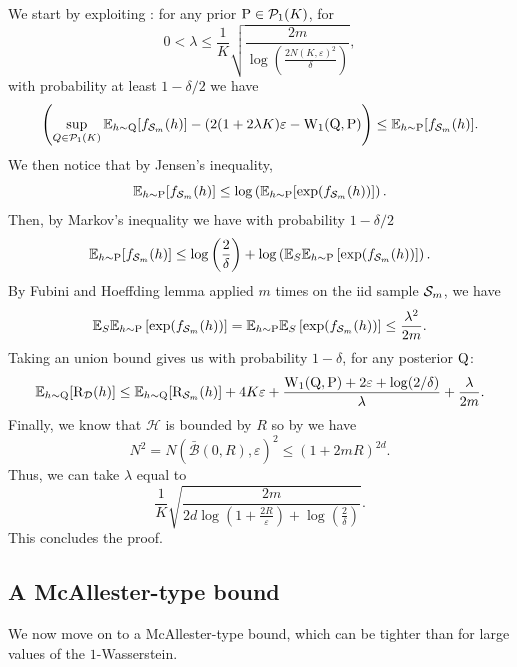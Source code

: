 We start by exploiting : for any prior $\P\in\mathcal{P}_1(K)$, for $$0<\lambda \leq  \frac{1}{K}\sqrt{\frac{2m}{\log\left(\frac{2N(K,\varepsilon)^2}{\delta}\right)}},$$
with probability at least $1-\delta/2$ we have
\[ \left(\sup_{Q\in \mathcal{P}_1(K)} \mathbb{E}_{h\sim \Q}[ f_{\Sm}(h)] - (2(1+2\lambda K)\varepsilon - \W_{1}(\Q,\P) \right) \leq \mathbb{E}_{h\sim \P}[ f_{\Sm}(h)]. \]
We then notice that by Jensen's inequality,  $$\mathbb{E}_{h\sim \P}[ f_{\Sm}(h)] \leq \log\left(\mathbb{E}_{h\sim \P}[ \exp(f_{\Sm}(h))]    \right).$$
Then, by Markov's inequality we have with probability $1-\delta/2$
\[ \mathbb{E}_{h\sim \P}[ f_{\Sm}(h)] \leq \log\left(\frac{2}{\delta}\right) + \log\left(\mathbb{E}_S\mathbb{E}_{h\sim \P}\left[ \exp(f_{\Sm}(h))   \right]\right).  \]
By Fubini and Hoeffding lemma applied $m$ times on the iid sample $\Sm$, we have
\[ \mathbb{E}_S\mathbb{E}_{h\sim \P}\left[ \exp(f_{\Sm}(h))\right] =  \mathbb{E}_{h\sim \P}\mathbb{E}_S\left[ \exp(f_{\Sm}(h))\right] \leq \frac{\lambda^2}{2m}. \]
Taking an union bound gives us with probability $1-\delta$, for any posterior $\Q$:
\[ \mathbb{E}_{h\sim \Q}[\Risk_{\D}(h)] \leq \mathbb{E}_{h\sim \Q}[\Risk_{\Sm}(h)] +   4K\varepsilon + \frac{\W_{1}(\Q,\P)+2\varepsilon +\log(2/\delta)}{\lambda} + \frac{\lambda}{2m}.   \]
Finally, we know that $\mathcal{H}$ is bounded by $R$ so by  we have $$N^2 = N(\bar{\mathcal{B}}(0,R), \varepsilon)^2 \leq \left(1+ 2mR \right)^{2d}.$$
Thus, we can take $\lambda$ equal to $$\frac{1}{K}\sqrt{\frac{2m}{2d\log(1+\frac{2R}{\varepsilon})+\log(\frac{2}{\delta})}}.$$
This concludes the proof.






\subsection{A McAllester-type bound}
We now move on to a McAllester-type bound, which can be tighter than  for large values of the $1$-Wasserstein.

